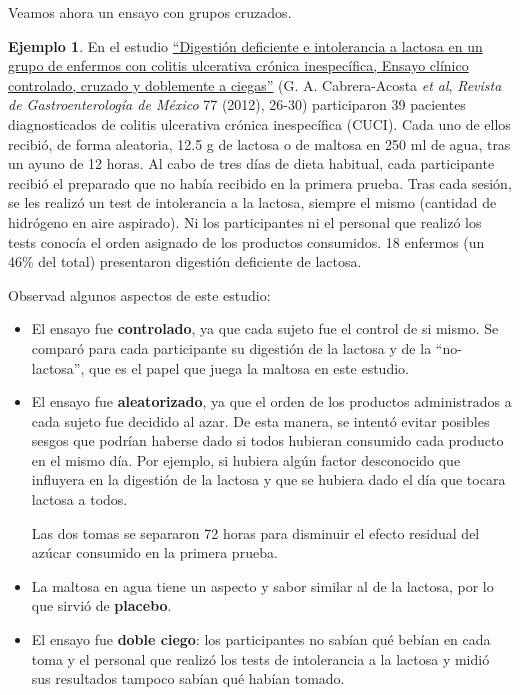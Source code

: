 \documentclass[
]{book}
\theoremstyle{definition}
\theoremstyle{definition}
\newtheorem{example}{Ejemplo}[chapter]
\theoremstyle{definition}
\theoremstyle{definition}
\theoremstyle{remark}
\begin{document}
Veamos ahora un ensayo con grupos cruzados.

\begin{example}
\protect\hypertarget{exm:creuat2cec}{}\label{exm:creuat2cec}En el estudio \href{http://www.revistagastroenterologiamexico.org/es-pdf-X0375090612226816}{``Digestión deficiente e intolerancia a lactosa en un grupo de enfermos con colitis ulcerativa crónica inespecífica, Ensayo clínico controlado, cruzado y doblemente a ciegas''} (G. A. Cabrera-Acosta \emph{et al}, \emph{Revista de Gastroenterología de México} 77 (2012), 26-30) participaron 39 pacientes diagnosticados de colitis ulcerativa crónica inespecífica (CUCI). Cada uno de ellos recibió, de forma aleatoria, 12.5 g de lactosa o de maltosa en 250 ml de agua, tras un ayuno de 12 horas. Al cabo de tres días de dieta habitual, cada participante recibió el preparado que no había recibido en la primera prueba. Tras cada sesión, se les realizó un test de intolerancia a la lactosa, siempre el mismo (cantidad de hidrógeno en aire aspirado). Ni los participantes ni el personal que realizó los tests conocía el orden asignado de los productos consumidos. 18 enfermos (un 46\% del total) presentaron digestión deficiente de lactosa.
\end{example}

Observad algunos aspectos de este estudio:

\begin{itemize}
\item
  El ensayo fue \textbf{controlado}, ya que cada sujeto fue el control de si mismo. Se comparó para cada participante su digestión de la lactosa y de la ``no-lactosa'', que es el papel que juega la maltosa en este estudio.
\item
  El ensayo fue \textbf{aleatorizado}, ya que el orden de los productos administrados a cada sujeto fue decidido al azar. De esta manera, se intentó evitar posibles sesgos que podrían haberse dado si todos hubieran consumido cada producto en el mismo día. Por ejemplo, si hubiera algún factor desconocido que influyera en la digestión de la lactosa y que se hubiera dado el día que tocara lactosa a todos.

  Las dos tomas se separaron 72 horas para disminuir el efecto residual del azúcar consumido en la primera prueba.
\item
  La maltosa en agua tiene un aspecto y sabor similar al de la lactosa, por lo que sirvió de \textbf{placebo}.
\item
  El ensayo fue \textbf{doble ciego}: los participantes no sabían qué bebían en cada toma y el personal que realizó los tests de intolerancia a la lactosa y midió sus resultados tampoco sabían qué habían tomado.
\end{itemize}
\end{document}
